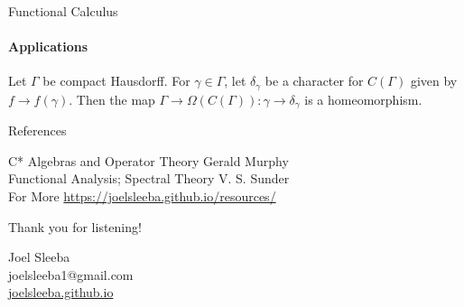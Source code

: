 \documentclass[handout, dvipsnames]{beamer}
\newcommand{\1}{\mathds{1}}	%
\begin{document}
\begin{frame}{Functional Calculus}
  \framesubtitle{Applications}
  \begin{theorem}
    Let $\Gamma$ be compact Hausdorff. For $\gamma \in \Gamma$, let $\delta_\gamma$ be a character for $C(\Gamma)$ given by $f \to f(\gamma)$. Then the map $\Gamma \to \Omega(C(\Gamma)): \gamma \to \delta_\gamma$ is a homeomorphism.
  \end{theorem}
\end{frame}



\begin{frame}{References}
\begin{thebibliography}{10}
\beamertemplatearticlebibitems
{\small

C* Algebras and Operator Theory
\newblock Gerald Murphy \\

Functional Analysis; Spectral Theory
\newblock V. S. Sunder\\

  For More
\newblock \url{https://joelsleeba.github.io/resources/}
}
\end{thebibliography}
\end{frame}


\begin{frame}
\begin{center}
{\large\color{titleText} Thank you for listening!}
\vspace{1cm}

Joel Sleeba \\[1em]
joelsleeba1@gmail.com \\
  \href{https://joelsleeba.github.io}{joelsleeba.github.io}
\end{center}
\end{frame}

\end{document}
